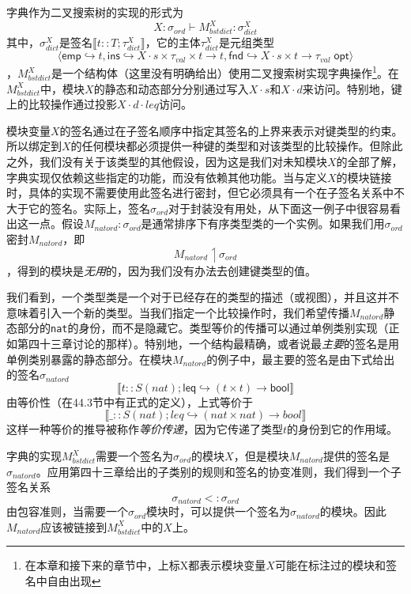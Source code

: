 字典作为二叉搜索树的实现的形式为$$X:\sigma_{ord} \vdash M_{bstdict}^X:\sigma_{dict}^X$$其中，$\sigma_{dict}^X$是签名$\llbracket t::T;\tau_{dict}^X\rrbracket$，它的主体$\tau_{dict}^X$是元组类型$$\langle \mathsf{emp} \hookrightarrow t ,\mathsf{ins} \hookrightarrow X \cdot s \times \tau_{val} \times t \rightarrow t ,\mathsf{fnd} \hookrightarrow X \cdot s \times t \rightarrow \tau_{val}\; \mathsf{opt} \rangle$$，$M_{bstdict}^X$是一个结构体（这里没有明确给出）使用二叉搜索树实现字典操作\footnote{在本章和接下来的章节中，上标X都表示模块变量$X$可能在标注过的模块和签名中自由出现}。在$M_{bstdict}^X$中，模块$X$的静态和动态部分分别通过写入$X \cdot s$和$X \cdot d$来访问。特别地，键上的比较操作通过投影$X \cdot d \cdot leq$访问。


模块变量$X$的签名通过在子签名顺序中指定其签名的上界来表示对键类型的约束。所以绑定到$X$的任何模块都必须提供一种键的类型和对该类型的比较操作。但除此之外，我们没有关于该类型的其他假设，因为这是我们对未知模块$X$的全部了解，字典实现仅依赖这些指定的功能，而没有依赖其他功能。当与定义$X$的模块链接时，具体的实现不需要使用此签名进行密封，但它必须具有一个在子签名关系中不大于它的签名。实际上，签名$\sigma_{ord}$对于封装没有用处，从下面这一例子中很容易看出这一点。假设$M _{natord}: \sigma_{ord}$是通常排序下有序类型类的一个实例。如果我们用$\sigma_{ord}$密封$M_{natord}$，即 $$M_{natord} \upharpoonleft \sigma_{ord}$$，得到的模块是\textit{无用}的，因为我们没有办法去创建键类型的值。


我们看到，一个类型类是一个对于已经存在的类型的描述（或视图），并且这并不意味着引入一个新的类型。当我们指定一个比较操作时，我们希望传播$M_{natord}$静态部分的\texttt{nat}的身份，而不是隐藏它。类型等价的传播可以通过单例类别实现（正如第四十三章讨论的那样）。特别地，一个结构最精确，或者说最\textit{主要}的签名是用单例类别暴露的静态部分。在模块$M_{natord}$的例子中，最主要的签名是由下式给出的签名$\sigma_{natord}$$$\llbracket t::S(nat);\mathsf{leq} \hookrightarrow (t \times t) \rightarrow \mathsf{bool} \rrbracket$$
由等价性（在44.3节中有正式的定义），上式等价于$$\llbracket \_::S(nat);leq \hookrightarrow (nat \times nat) \rightarrow bool \rrbracket$$这样一种等价的推导被称作\textit{等价传递}，因为它传递了类型$t$的身份到它的作用域。

字典的实现$M_{bstdict}^X$需要一个签名为$\sigma_{ord}$的模块$X$，但是模块$M_{natord}$提供的签名是$\sigma_{natord}$。应用第四十三章给出的子类别的规则和签名的协变准则，我们得到一个子签名关系$$\sigma_{natord} <: \sigma_{ord}$$由包容准则，当需要一个$\sigma_{ord}$模块时，可以提供一个签名为$\sigma_{natord}$的模块。因此$M_{natord}$应该被链接到$M_{bstdict}^X$中的$X$上。

